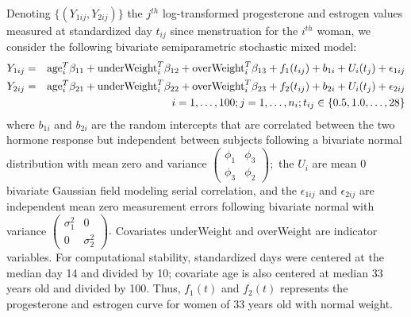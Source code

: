 \documentclass[article,lineno]{biometrika}
\begin{document}
Denoting $\{(Y_{1ij}, Y_{2ij})\}$ the $j^{th}$ log-transformed progesterone and estrogen values measured at standardized day $t_{ij}$ since menstruation for the $i^{th}$ woman, we consider the following bivariate semiparametric stochastic mixed model:
\begin{eqnarray*}
Y_{1ij} &=& {\rm age}_i^T  \beta_{11}  + {\rm underWeight}_i^T  \beta_{12}
+ {\rm overWeight}_i^T  \beta_{13}
+ f_1(t_{ij}) + b_{1i} + U_i(t_j) + \epsilon_{1ij} 
 \\
Y_{2ij} &=& {\rm age}_i^T  \beta_{21} +  {\rm underWeight}_i^T  \beta_{22}
+  {\rm overWeight}_i^T  \beta_{23}
+ f_2(t_{ij}) + b_{2i} + U_i(t_j) + \epsilon_{2ij} 
\\
&& i = 1, \dots, 100; j  = 1, \dots, n_i; t_{ij} \in \{0.5, 1.0, \dots, 28\}
\end{eqnarray*}
where $b_{1i}$ and $b_{2i}$ are the random intercepts that are correlated between the two hormone response but independent between subjects following a bivariate normal distribution with mean zero and variance 
$
\begin{pmatrix}
\phi_{1} &   \phi_{3}  \\
\phi_{3} &   \phi_{2} 
\end{pmatrix};
$
the $U_i$ are mean $0$ bivariate Gaussian field modeling serial correlation, and the $ \epsilon_{1ij} $ and $ \epsilon_{2ij}$ are independent mean zero measurement errors following bivariate normal with variance  
$
  \begin{pmatrix}
 \sigma_1^2 & 0  \\
0 &   \sigma_2^2 
 \end{pmatrix}.
$
Covariates underWeight and overWeight are indicator variables. 
For computational stability, standardized days were centered at the median day 14 and divided by 10; covariate age is also centered at median 33 years old and divided by 100. Thus, $f_1(t)$ and $f_2(t)$ represents the progesterone and estrogen curve for women of 33 years old with normal weight. 
\end{document}
